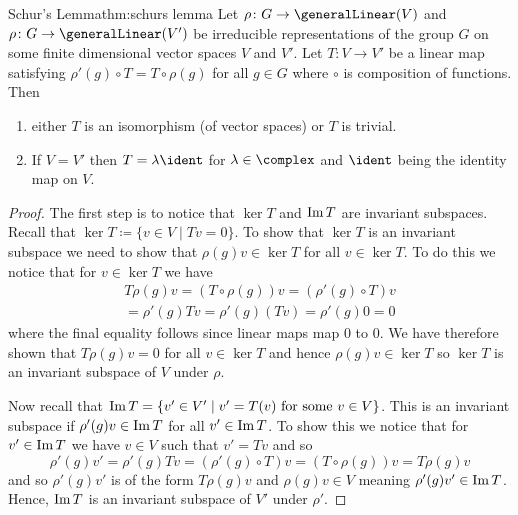 \begin{thm}{Schur's Lemma}{thm:schurs lemma}
    Let \(\rho\colon G \to \generalLinear(V)\) and \(\rho\colon G \to
    \generalLinear(V')\) be irreducible representations of the group \(G\) on some
    finite dimensional vector spaces \(V\) and \(V'\).
    Let \(T \colon V \to V'\) be a linear map satisfying \(\rho'(g) \circ T
    = T \circ \rho(g)\) for all \(g \in G\) where \(\circ\) is composition of
    functions.
    Then
    \begin{enumerate}
        \item either \(T\) is an isomorphism (of vector spaces) or \(T\) is trivial.
        \item If \(V = V'\) then \(T = \lambda\ident\) for \(\lambda \in
        \complex\) and \(\ident\) being the identity map on \(V\).
    \end{enumerate}
    \begin{proof}
        The first step is to notice that \(\ker T\) and \(\operatorname{Im} T\) are
        invariant subspaces.
        Recall that \(\ker T \coloneqq \{v \in V \mid Tv = 0\}\).
        To show that \(\ker T\) is an invariant subspace we need to show
        that \(\rho(g)v \in \ker T\) for all \(v \in \ker T\).
        To do this we notice that for \(v\in\ker T\) we have
        \begin{multline}
            T\rho(g)v = (T \circ \rho(g))v = (\rho'(g) \circ T)v\\
            = \rho'(g)Tv = \rho'(g)(Tv) = \rho'(g)0 = 0
        \end{multline}
        where the final equality follows since linear maps map 0 to 0.
        We have therefore shown that \(T\rho(g)v = 0\) for all \(v \in \ker
        T\) and hence \(\rho(g)v \in \ker T\) so \(\ker T\) is an invariant subspace of
        \(V\) under \(\rho\).
        
        Now recall that \(\operatorname{Im} T = \{v' \in V' \mid v' = T(v) \text{ for
            some } v \in V\}\).
        This is an invariant subspace if \(\rho'(g)v \in \operatorname{Im} T\) for all
        \(v' \in \operatorname{Im} T\).
        To show this we notice that for \(v' \in \operatorname{Im} T\) we have \(v\in
        V\) such that \(v' = Tv\) and so
        \begin{equation}
            \rho'(g)v' = \rho'(g)Tv = (\rho'(g) \circ T)v = (T\circ
            \rho(g))v = T\rho(g)v
        \end{equation}
        and so \(\rho'(g)v'\) is of the form \(T\rho(g)v\) and \(\rho(g)v
        \in V\) meaning \(\rho'(g) v' \in \operatorname{Im} T\).
        Hence, \(\operatorname{Im} T\) is an invariant subspace of \(V'\) under
        \(\rho'\).
        

\end{proof}
\end{thm}
